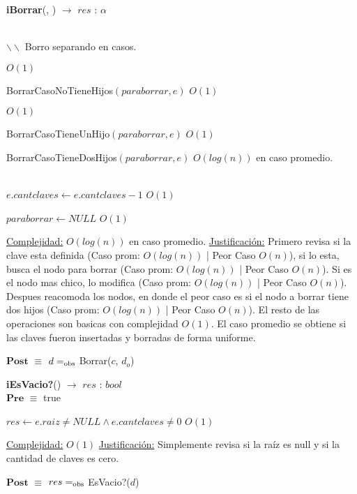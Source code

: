 \begin{algorithm}[H]{\textbf{iBorrar}(, ) $\to$ $res$ : $\alpha$}
\begin{algorithmic}[1]
				\EndIf

			\EndIf
			\\

			\State $\backslash\backslash$ Borro separando en casos.

			 \Comment $O(1)$

				\State BorrarCasoNoTieneHijos$(paraborrar, e)$ \Comment $O(1)$

			 \Comment $O(1)$

				\State BorrarCasoTieneUnHijo$(paraborrar, e)$ \Comment $O(1)$

			\Else

				\State BorrarCasoTieneDosHijos$(paraborrar, e)$ \Comment $O(log(n))$ en caso promedio.

			\EndIf
			\\
			
			\State $e.cantclaves \gets e.cantclaves -1$ \Comment $O(1)$

			\State $paraborrar \gets NULL$ \Comment $O(1)$

		\EndIf

		\medskip
		\Statex \underline{Complejidad:} $O(log(n))$ en caso promedio.
		\Statex \underline{Justificación:} Primero revisa si la clave esta definida (Caso prom: $O(log(n))$ | Peor Caso $O(n)$), si lo esta, busca el nodo para borrar (Caso prom: $O(log(n))$ | Peor Caso $O(n)$). Si es el nodo mas chico, lo modifica (Caso prom: $O(log(n))$ | Peor Caso $O(n)$). Despues reacomoda los nodos, en donde el peor caso es si el nodo a borrar tiene dos hijos (Caso prom: $O(log(n))$ | Peor Caso $O(n)$). El resto de las operaciones son basicas con complejidad $O(1)$. El caso promedio se obtiene si las claves fueron insertadas y borradas de forma uniforme.

    \end{algorithmic}
    {$\textbf{Post}$ $\equiv$ $d =_{\mathrm{obs}}$ Borrar($c$, $d_o$)}
\end{algorithm}


\begin{algorithm}[H]{\textbf{iEsVacio?}() $\to$ $res$ : $bool$}
	{\\ $\textbf{Pre}$ $\equiv$ true}
	\begin{algorithmic}[1]

		\State $res \gets e.raiz \neq NULL \land e.cantclaves \neq 0$ \Comment $O(1)$

		\medskip
		\Statex \underline{Complejidad:} $O(1)$
		\Statex \underline{Justificación:} Simplemente revisa si la raíz es null y si la cantidad de claves es cero.

    \end{algorithmic}
    {$\textbf{Post}$ $\equiv$ $res =_{\mathrm{obs}}$ EsVacio?($d$)}
\end{algorithm}


